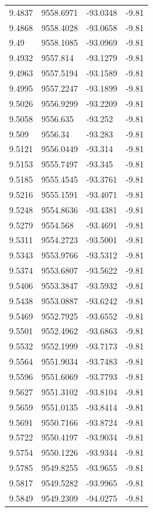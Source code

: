\begin{table}[H]
\begin{tabular}{llll}
9.4837 & 9558.6971 & -93.0348 & -9.81 \\
9.4868 & 9558.4028 & -93.0658 & -9.81 \\
9.49 & 9558.1085 & -93.0969 & -9.81 \\
9.4932 & 9557.814 & -93.1279 & -9.81 \\
9.4963 & 9557.5194 & -93.1589 & -9.81 \\
9.4995 & 9557.2247 & -93.1899 & -9.81 \\
9.5026 & 9556.9299 & -93.2209 & -9.81 \\
9.5058 & 9556.635 & -93.252 & -9.81 \\
9.509 & 9556.34 & -93.283 & -9.81 \\
9.5121 & 9556.0449 & -93.314 & -9.81 \\
9.5153 & 9555.7497 & -93.345 & -9.81 \\
9.5185 & 9555.4545 & -93.3761 & -9.81 \\
9.5216 & 9555.1591 & -93.4071 & -9.81 \\
9.5248 & 9554.8636 & -93.4381 & -9.81 \\
9.5279 & 9554.568 & -93.4691 & -9.81 \\
9.5311 & 9554.2723 & -93.5001 & -9.81 \\
9.5343 & 9553.9766 & -93.5312 & -9.81 \\
9.5374 & 9553.6807 & -93.5622 & -9.81 \\
9.5406 & 9553.3847 & -93.5932 & -9.81 \\
9.5438 & 9553.0887 & -93.6242 & -9.81 \\
9.5469 & 9552.7925 & -93.6552 & -9.81 \\
9.5501 & 9552.4962 & -93.6863 & -9.81 \\
9.5532 & 9552.1999 & -93.7173 & -9.81 \\
9.5564 & 9551.9034 & -93.7483 & -9.81 \\
9.5596 & 9551.6069 & -93.7793 & -9.81 \\
9.5627 & 9551.3102 & -93.8104 & -9.81 \\
9.5659 & 9551.0135 & -93.8414 & -9.81 \\
9.5691 & 9550.7166 & -93.8724 & -9.81 \\
9.5722 & 9550.4197 & -93.9034 & -9.81 \\
9.5754 & 9550.1226 & -93.9344 & -9.81 \\
9.5785 & 9549.8255 & -93.9655 & -9.81 \\
9.5817 & 9549.5282 & -93.9965 & -9.81 \\
9.5849 & 9549.2309 & -94.0275 & -9.81 \\

\end{tabular}
\end{table}
